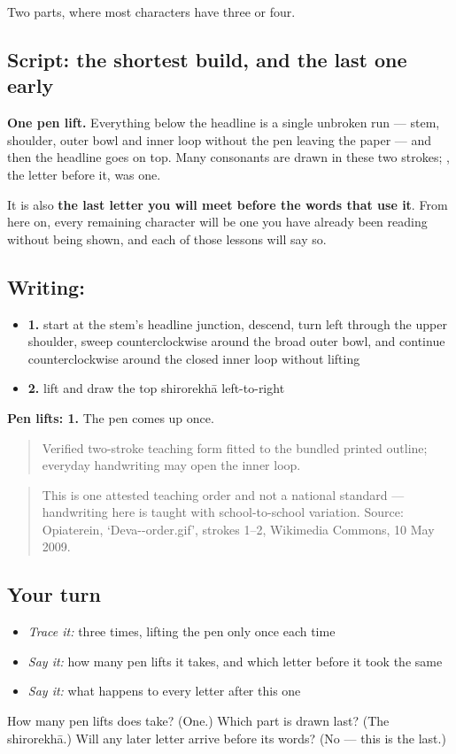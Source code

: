 Two parts, where most characters have three or four.

\subsection*{Script: the shortest build, and the last one early}
\textbf{One pen lift.} Everything below the headline is a single unbroken run — stem, shoulder, outer bowl and inner loop without the pen leaving the paper — and then the headline goes on top. Many consonants are drawn in these two strokes; \textbf{}, the letter before it, was one.

It is also \textbf{the last letter you will meet before the words that use it}. From here on, every remaining character will be one you have already been reading without being shown, and each of those lessons will say so.

\subsection*{Writing: }

\begin{itemize}
\raggedright
  \item \textbf{1.} start at the stem's headline junction, descend, turn left through the upper shoulder, sweep counterclockwise around the broad outer bowl, and continue counterclockwise around the closed inner loop without lifting
  \item \textbf{2.} lift and draw the top shirorekhā left-to-right
\end{itemize}

\textbf{Pen lifts: 1.} The pen comes up once.

\begin{quote}
Verified two-stroke teaching form fitted to the bundled printed outline; everyday handwriting may open the inner loop.
\end{quote}

\begin{quote}
This is one attested teaching order and not a national standard — handwriting here is taught with school-to-school variation. Source: Opiaterein, ‘Deva--order.gif’, strokes 1–2, Wikimedia Commons, 10 May 2009.
\end{quote}

\subsection*{Your turn}
\begin{itemize}
\raggedright
  \item \emph{Trace it:}  three times, lifting the pen only once each time
  \item \emph{Say it:} how many pen lifts it takes, and which letter before it took the same
  \item \emph{Say it:} what happens to every letter after this one
\end{itemize}

\begin{tcolorbox}[breakable,colback=teal!4,colframe=teal!35!black,title={Before you move on}]
How many pen lifts does \textbf{} take? (One.) Which part is drawn last? (The shirorekhā.) Will any later letter arrive before its words? (No — this is the last.)
\end{tcolorbox}
